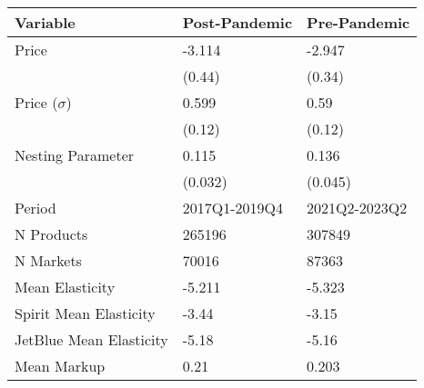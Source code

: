 
\begin{tabular}[t]{lll}
\toprule
Variable & Post-Pandemic & Pre-Pandemic\\
\midrule
Price & -3.114 & -2.947\\
 & (0.44) & (0.34)\\
\midrule
Price ($\sigma$) & 0.599 & 0.59\\
 & (0.12) & (0.12)\\
\midrule
Nesting Parameter & 0.115 & 0.136\\
 & (0.032) & (0.045)\\
\midrule
Period & 2017Q1-2019Q4 & 2021Q2-2023Q2\\
N Products & 265196 & 307849\\
N Markets & 70016 & 87363\\
Mean Elasticity & -5.211 & -5.323\\
Spirit Mean Elasticity & -3.44 & -3.15\\
JetBlue Mean Elasticity & -5.18 & -5.16\\
Mean Markup & 0.21 & 0.203\\
\bottomrule
\end{tabular}
